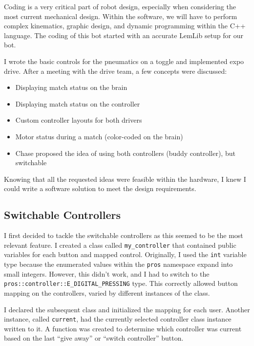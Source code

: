 Coding is a very critical part of robot design, especially when considering the most current mechanical design. Within the software, we will have to perform complex kinematics, graphic design, and dynamic programming within the C++ language. The coding of this bot started with an accurate LemLib setup for our bot.


I wrote the basic controls for the pneumatics on a toggle and implemented expo drive. After a meeting with the drive team, a few concepts were discussed:
\begin{itemize}
    \item Displaying match status on the brain
    \item Displaying match status on the controller
    \item Custom controller layouts for both drivers
    \item Motor status during a match (color-coded on the brain)
    \item Chase proposed the idea of using both controllers (buddy controller), but switchable
\end{itemize}

Knowing that all the requested ideas were feasible within the hardware, I knew I could write a software solution to meet the design requirements. 

\subsection*{Switchable Controllers}
I first decided to tackle the switchable controllers as this seemed to be the most relevant feature. I created a class called \texttt{my\_controller} that contained public variables for each button and mapped control. Originally, I used the \texttt{int} variable type because the enumerated values within the \texttt{pros} namespace expand into small integers. However, this didn’t work, and I had to switch to the \texttt{pros::controller::E\_DIGITAL\_PRESSING} type. This correctly allowed button mapping on the controllers, varied by different instances of the class.

I declared the subsequent class and initialized the mapping for each user. Another instance, called \texttt{current}, had the currently selected controller class instance written to it. A function was created to determine which controller was current based on the last “give away” or “switch controller” button. 

